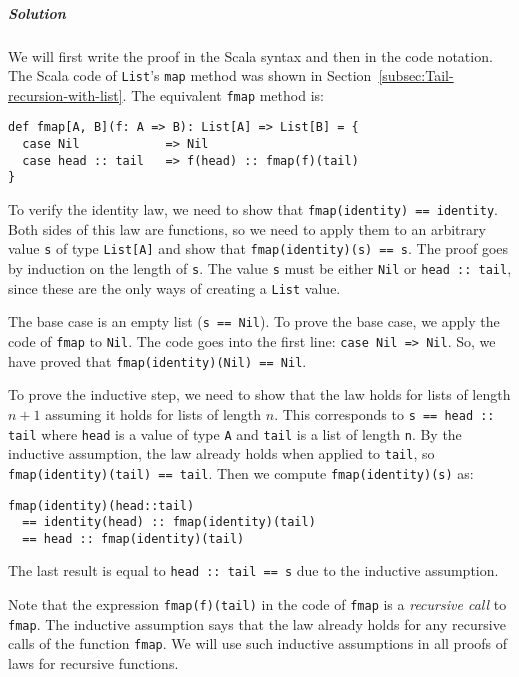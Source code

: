\subparagraph{Solution}

We will first write the proof in the Scala syntax and then in the
code notation. The Scala code of \lstinline!List!\textsf{'}s \lstinline!map!
method was shown in Section~\ref{subsec:Tail-recursion-with-list}.
The equivalent \lstinline!fmap! method is:
\begin{lstlisting}
def fmap[A, B](f: A => B): List[A] => List[B] = {
  case Nil            => Nil
  case head :: tail   => f(head) :: fmap(f)(tail)
}
\end{lstlisting}

To verify the identity law, we need to show that \lstinline!fmap(identity) == identity!.
Both sides of this law are functions, so we need to apply them to
an arbitrary value \lstinline!s! of type \lstinline!List[A]! and
show that \lstinline!fmap(identity)(s) == s!. The proof goes by induction
on the length of \lstinline!s!. The value \lstinline!s! must be
either \lstinline!Nil! or \lstinline!head :: tail!, since these
are the only ways of creating a \lstinline!List! value.

The base case is an empty list (\lstinline!s == Nil!). To prove the
base case, we apply the code of \lstinline!fmap! to \lstinline!Nil!.
The code goes into the first line: \lstinline!case Nil => Nil!. So,
we have proved that \lstinline!fmap(identity)(Nil) == Nil!.

To prove the inductive step, we need to show that the law holds for
lists of length $n+1$ assuming it holds for lists of length $n$.
This corresponds to \lstinline!s == head :: tail! where \lstinline!head!
is a value of type \lstinline!A! and \lstinline!tail! is a list
of length \lstinline!n!. By the inductive assumption, the law already
holds when applied to \lstinline!tail!, so \lstinline!fmap(identity)(tail) == tail!.
Then we compute \lstinline!fmap(identity)(s)! as:
\begin{lstlisting}
fmap(identity)(head::tail)
  == identity(head) :: fmap(identity)(tail)
  == head :: fmap(identity)(tail)
\end{lstlisting}
The last result is equal to \lstinline!head :: tail == s! due to
the inductive assumption.

Note that the expression \lstinline!fmap(f)(tail)! in the code of
\lstinline!fmap! is a \emph{recursive call} to \lstinline!fmap!.
The inductive assumption says that the law already holds for any recursive
calls of the function \lstinline!fmap!. We will use such inductive
assumptions in all proofs of laws for recursive functions.

